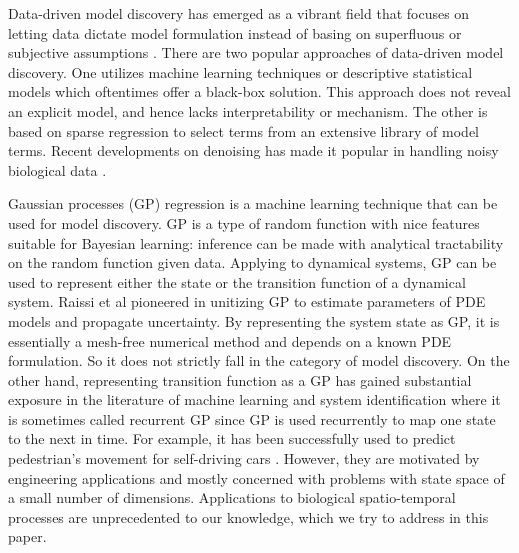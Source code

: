 \documentclass[11pt, reqno]{amsart}
\begin{document}
Data-driven model discovery has emerged as a vibrant field that focuses on letting data dictate model formulation instead of basing on superfluous or subjective assumptions \citep{Brunton2019}. There are two popular approaches of data-driven model discovery. One utilizes machine learning techniques or descriptive statistical models which oftentimes offer a black-box solution. This approach does not reveal an explicit model, and hence lacks interpretability or mechanism. The other is based on sparse regression to select terms from an extensive library of model terms. Recent developments on denoising has made it popular in handling noisy biological data \citep{Nardini2020,Lagergren2020a}.

Gaussian processes (GP) regression is a machine learning technique that can be used for model discovery. GP is a type of random function with nice features suitable for Bayesian learning: inference can be made with analytical tractability on the random function given data. Applying to dynamical systems, GP can be used to represent either the state or the transition function of a dynamical system.   Raissi et al \citep{Raissi2018,Raissi2018a} pioneered in unitizing GP to estimate parameters of PDE models and propagate uncertainty.  By representing the system state as GP, it is essentially a mesh-free numerical method and depends on a known PDE formulation. So it does not strictly fall in the category of model discovery. On the other hand, representing transition function as a GP has gained substantial exposure in the literature of machine learning and system identification \citep{girard2003gaussian,deisenroth2009analytic} where it is sometimes called recurrent GP since GP is used recurrently to map one state to the next in time. For example, it has been successfully used to predict pedestrian's movement for self-driving cars \citep{Wang2008}. However, they are motivated by engineering applications and mostly concerned with problems with state space of a small number of dimensions. Applications to biological spatio-temporal processes are unprecedented to our knowledge, which we try to address in this paper.
\end{document}
